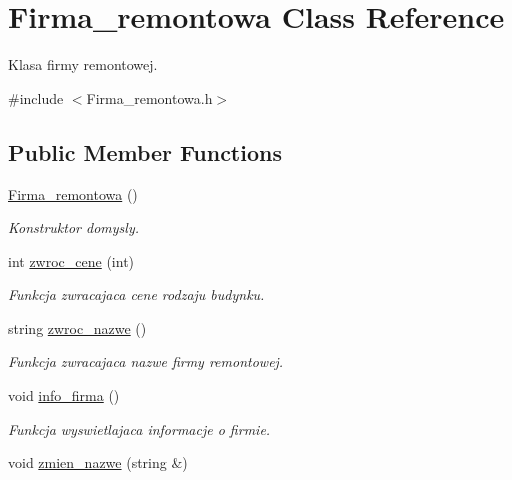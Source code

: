 \hypertarget{class_firma__remontowa}{}\section{Firma\+\_\+remontowa Class Reference}
\label{class_firma__remontowa}


Klasa firmy remontowej.  




{\ttfamily \#include $<$Firma\+\_\+remontowa.\+h$>$}

\subsection*{Public Member Functions}
\begin{DoxyCompactItemize}
\item 
\hypertarget{class_firma__remontowa_a86d679b734a66ee5ffdd15f470815792}{}\hyperlink{class_firma__remontowa_a86d679b734a66ee5ffdd15f470815792}{Firma\+\_\+remontowa} ()\label{class_firma__remontowa_a86d679b734a66ee5ffdd15f470815792}

\begin{DoxyCompactList}\small\item\em Konstruktor domysly. \end{DoxyCompactList}\item 
int \hyperlink{class_firma__remontowa_acc5540b46df2bd85c4357870b2b086f5}{zwroc\+\_\+cene} (int)
\begin{DoxyCompactList}\small\item\em Funkcja zwracajaca cene rodzaju budynku. \end{DoxyCompactList}\item 
string \hyperlink{class_firma__remontowa_ac58421192dc9b68dcd5f7ed35faf58da}{zwroc\+\_\+nazwe} ()
\begin{DoxyCompactList}\small\item\em Funkcja zwracajaca nazwe firmy remontowej. \end{DoxyCompactList}\item 
\hypertarget{class_firma__remontowa_acd19620a53800f84df0fbe377f28dd64}{}void \hyperlink{class_firma__remontowa_acd19620a53800f84df0fbe377f28dd64}{info\+\_\+firma} ()\label{class_firma__remontowa_acd19620a53800f84df0fbe377f28dd64}

\begin{DoxyCompactList}\small\item\em Funkcja wyswietlajaca informacje o firmie. \end{DoxyCompactList}\item 
\hypertarget{class_firma__remontowa_a2097892c4af1ca175b73072d7b4176a7}{}void \hyperlink{class_firma__remontowa_a2097892c4af1ca175b73072d7b4176a7}{zmien\+\_\+nazwe} (string \&)\label{class_firma__remontowa_a2097892c4af1ca175b73072d7b4176a7}


\end{DoxyCompactItemize}
